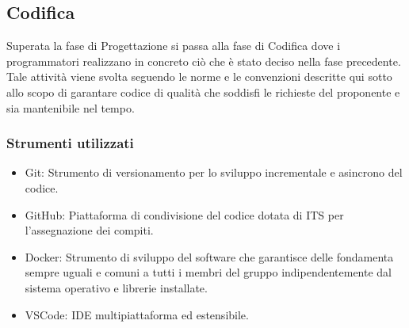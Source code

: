 \subsection{Codifica}
Superata la fase di Progettazione si passa alla fase di Codifica dove i programmatori
realizzano in concreto ciò che è stato deciso nella fase precedente.
Tale attività viene svolta seguendo le norme e le convenzioni descritte qui sotto allo
scopo di garantare codice di qualità che soddisfi le richieste del proponente e sia mantenibile nel tempo.

\subsubsection{Strumenti utilizzati}
    \begin{itemize}
    \item Git: Strumento di versionamento per lo sviluppo incrementale e asincrono del codice.
    \item GitHub: Piattaforma di condivisione del codice dotata di ITS per l'assegnazione dei compiti.
    \item Docker: Strumento di sviluppo del software che garantisce delle fondamenta sempre uguali
      e comuni a tutti i membri del gruppo indipendentemente dal sistema operativo e librerie installate.
    \item VSCode: IDE multipiattaforma ed estensibile.
    \end{itemize}
